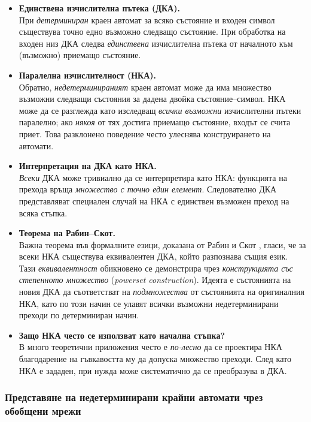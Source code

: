 \begin{itemize}
    \item \textbf{Единствена изчислителна пътека (ДКА).}\\
    При \emph{детерминиран} краен автомат за всяко състояние и входен символ съществува точно едно възможно следващо състояние. При обработка на входен низ ДКА следва \emph{единствена} изчислителна пътека от началното към (възможно) приемащо състояние.

    \item \textbf{Паралелна изчислителност (НКА).}\\
    Обратно, \emph{недетерминираният} краен автомат може да има множество възможни следващи състояния за дадена двойка състояние–символ. НКА може да се разглежда като изследващ \emph{всички възможни} изчислителни пътеки паралелно; ако \emph{някоя} от тях достига приемащо състояние, входът се счита приет. Това разклонено поведение често улеснява конструирането на автомати.

    \item \textbf{Интерпретация на ДКА като НКА.}\\
    \emph{Всеки} ДКА може тривиално да се интерпретира като НКА: функцията на прехода връща \emph{множество с точно един елемент}. Следователно ДКА представляват специален случай на НКА с единствен възможен преход на всяка стъпка.

    \item \textbf{Теорема на Рабин–Скот.} \\
    Важна теорема във формалните езици, доказана от Рабин и Скот \cite{rabin-scott}, гласи, че за всеки НКА съществува еквивалентен ДКА, който разпознава същия език. Тази \emph{еквивалентност} обикновено се демонстрира чрез \emph{конструкцията със степенното множество} (\textit{powerset construction}). Идеята е състоянията на новия ДКА да съответстват на \emph{подмножества} от състоянията на оригиналния НКА, като по този начин се улавят всички възможни недетерминирани преходи по детерминиран начин.

    \item \textbf{Защо НКА често се използват като начална стъпка?} \\
    В много теоретични приложения често е \emph{по-лесно} да се проектира НКА благодарение на гъвкавостта му да допуска множество преходи. След като НКА е зададен, при нужда може систематично да се преобразува в ДКА.
\end{itemize}

\subsubsection{Представяне на недетерминирани крайни автомати чрез обобщени мрежи}
\label{sec:simulating_automata_gn}

